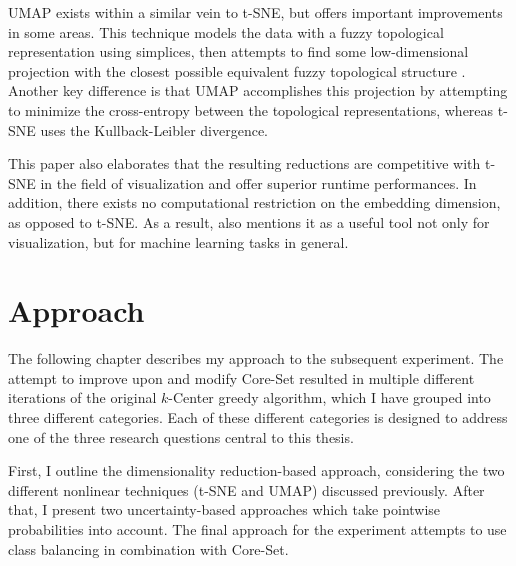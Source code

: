 \documentclass[english,bachelor,ul]{webisthesis} %
\begin{document}
UMAP exists within a similar vein to t-SNE, but offers important improvements in some areas. This technique models the data with a fuzzy topological representation using simplices, then attempts to find some low-dimensional projection with the closest possible equivalent fuzzy topological structure \citep{DBLP:journals/corr/abs-1802-03426}. Another key difference is that UMAP accomplishes this projection by attempting to minimize the cross-entropy between the topological representations, whereas t-SNE uses the Kullback-Leibler divergence. 

This paper also elaborates that the resulting reductions are competitive with t-SNE in the field of visualization and offer superior runtime performances. In addition, there exists no computational restriction on the embedding dimension, as opposed to t-SNE. As a result, \cite{DBLP:journals/corr/abs-1802-03426} also mentions it as a useful tool not only for visualization, but for machine learning tasks in general.


\chapter{Approach}

The following chapter describes my approach to the subsequent experiment. The attempt to improve upon and modify Core-Set resulted in multiple different iterations of the original $k$-Center greedy algorithm, which I have grouped into three different categories. Each of these different categories is designed to address one of the three research questions central to this thesis. 

First, I outline the dimensionality reduction-based approach, considering the two different nonlinear techniques (t-SNE and UMAP) discussed previously. After that, I present two uncertainty-based approaches which take pointwise probabilities into account. The final approach for the experiment attempts to use class balancing in combination with Core-Set.
\end{document}

